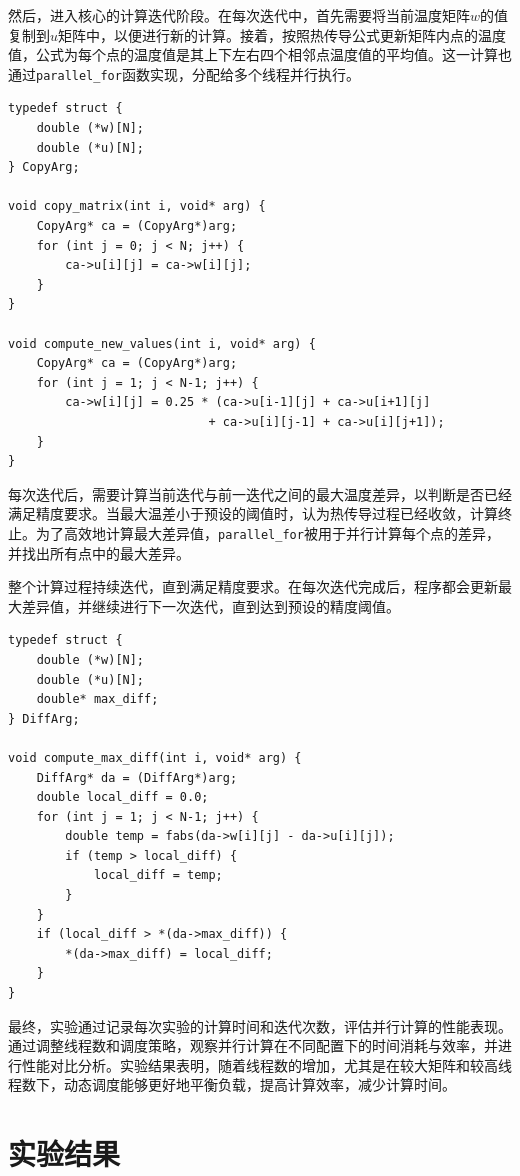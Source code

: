 \documentclass[a4paper, utf8]{ctexart}
\begin{document}
	然后，进入核心的计算迭代阶段。在每次迭代中，首先需要将当前温度矩阵$w$的值复制到$u$矩阵中，以便进行新的计算。接着，按照热传导公式更新矩阵内点的温度值，公式为每个点的温度值是其上下左右四个相邻点温度值的平均值。这一计算也通过\verb|parallel_for|函数实现，分配给多个线程并行执行。
	
	\begin{verbatim}
typedef struct {
    double (*w)[N];
    double (*u)[N];
} CopyArg;

void copy_matrix(int i, void* arg) {
    CopyArg* ca = (CopyArg*)arg;
    for (int j = 0; j < N; j++) {
        ca->u[i][j] = ca->w[i][j];
    }
}

void compute_new_values(int i, void* arg) {
    CopyArg* ca = (CopyArg*)arg;
    for (int j = 1; j < N-1; j++) {
        ca->w[i][j] = 0.25 * (ca->u[i-1][j] + ca->u[i+1][j]
                            + ca->u[i][j-1] + ca->u[i][j+1]);
    }
}
	\end{verbatim}
	
	每次迭代后，需要计算当前迭代与前一迭代之间的最大温度差异，以判断是否已经满足精度要求。当最大温差小于预设的阈值时，认为热传导过程已经收敛，计算终止。为了高效地计算最大差异值，\verb|parallel_for|被用于并行计算每个点的差异，并找出所有点中的最大差异。
	
	整个计算过程持续迭代，直到满足精度要求。在每次迭代完成后，程序都会更新最大差异值，并继续进行下一次迭代，直到达到预设的精度阈值。
	
	\begin{verbatim}
typedef struct {
    double (*w)[N];
    double (*u)[N];
    double* max_diff;
} DiffArg;

void compute_max_diff(int i, void* arg) {
    DiffArg* da = (DiffArg*)arg;
    double local_diff = 0.0;
    for (int j = 1; j < N-1; j++) {
        double temp = fabs(da->w[i][j] - da->u[i][j]);
        if (temp > local_diff) {
            local_diff = temp;
        }
    }
    if (local_diff > *(da->max_diff)) {
        *(da->max_diff) = local_diff;
    }
}
	\end{verbatim}
	
	最终，实验通过记录每次实验的计算时间和迭代次数，评估并行计算的性能表现。通过调整线程数和调度策略，观察并行计算在不同配置下的时间消耗与效率，并进行性能对比分析。实验结果表明，随着线程数的增加，尤其是在较大矩阵和较高线程数下，动态调度能够更好地平衡负载，提高计算效率，减少计算时间。
	
	\section{实验结果}
	
\end{document}
